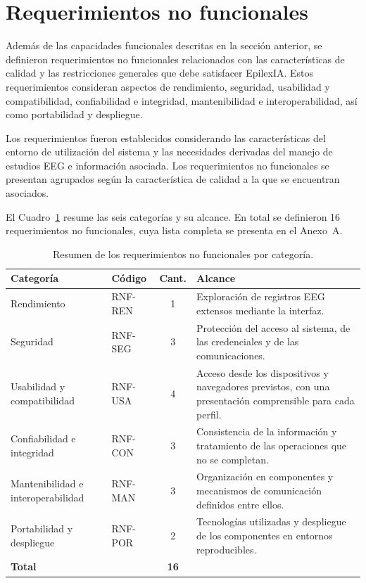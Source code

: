 \section{Requerimientos no funcionales}
\label{sec:requerimientos-no-funcionales}

Además de las capacidades funcionales descritas en la sección anterior, se
definieron requerimientos no funcionales relacionados con las características
de calidad y las restricciones generales que debe satisfacer EpilexIA. Estos
requerimientos consideran aspectos de rendimiento, seguridad, usabilidad y
compatibilidad, confiabilidad e integridad, mantenibilidad e interoperabilidad,
así como portabilidad y despliegue.

Los requerimientos fueron establecidos considerando las características del
entorno de utilización del sistema y las necesidades derivadas del manejo de
estudios EEG e información asociada. Los requerimientos no funcionales se presentan
agrupados según la característica de calidad a la que se encuentran asociados.

\begin{nuevotexto}
El Cuadro~\ref{tab:resumen-rnf} resume las seis categorías y su alcance.
En total se definieron 16 requerimientos no funcionales, cuya lista completa se presenta en el Anexo~A.

\begin{table}[H]
\centering
\marcanuevo
\caption{Resumen de los requerimientos no funcionales por categoría.}
\label{tab:resumen-rnf}
\small
\renewcommand{\arraystretch}{1.2}
\begin{tabular}{|p{3.6cm}|p{1.6cm}|c|p{7.2cm}|}
\hline
\textbf{Categoría} & \textbf{Código} & \textbf{Cant.} & \textbf{Alcance} \\
\hline
Rendimiento & RNF-REN & 1 & Exploración de registros EEG extensos mediante la interfaz. \\
\hline
Seguridad & RNF-SEG & 3 & Protección del acceso al sistema, de las credenciales y de las comunicaciones. \\
\hline
Usabilidad y compatibilidad & RNF-USA & 4 & Acceso desde los dispositivos y navegadores previstos, con una presentación comprensible para cada perfil. \\
\hline
Confiabilidad e integridad & RNF-CON & 3 & Consistencia de la información y tratamiento de las operaciones que no se completan. \\
\hline
Mantenibilidad e interoperabilidad & RNF-MAN & 3 & Organización en componentes y mecanismos de comunicación definidos entre ellos. \\
\hline
Portabilidad y despliegue & RNF-POR & 2 & Tecnologías utilizadas y despliegue de los componentes en entornos reproducibles. \\
\hline
\textbf{Total} & & \textbf{16} & \\
\hline
\end{tabular}
\end{table}
\end{nuevotexto}

